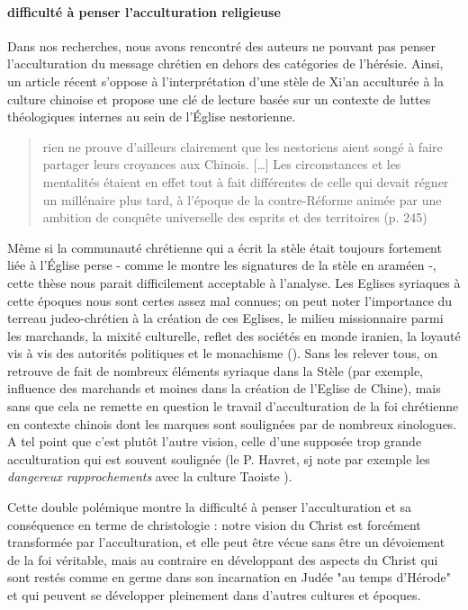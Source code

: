 \paragraph{difficulté à penser l'acculturation religieuse} Dans nos recherches, nous avons rencontré des auteurs ne pouvant pas penser l'acculturation du message chrétien en dehors des catégories de l'hérésie. Ainsi, un article récent \cite{Gernet:Stele} s'oppose à l'interprétation d'une stèle de Xi'an acculturée à la culture chinoise et propose une clé de lecture basée sur un contexte de luttes théologiques internes au sein de l'Église nestorienne.

\begin{quote}
    rien ne prouve d'ailleurs clairement que les nestoriens aient songé à faire partager leurs croyances aux Chinois. [\ldots] Les circonstances et les mentalités étaient en effet tout à fait différentes de celle qui devait régner un millénaire plus tard, à l'époque de la contre-Réforme animée par une ambition de conquête universelle des esprits et des territoires (p. 245)
\end{quote}
Même si la communauté chrétienne qui a écrit la stèle était toujours fortement liée à l'Église perse - comme le montre les signatures de la stèle en araméen -, cette thèse nous parait difficilement acceptable à l'analyse. Les Eglises syriaques à cette époques nous sont certes assez mal connues; on peut noter l'importance du terreau judeo-chrétien à la création de ces Eglises, le milieu missionnaire parmi les marchands, la mixité culturelle, reflet des sociétés en monde iranien, la loyauté vis à vis des autorités politiques et le monachisme (\cite{Amir:CoranHistoriens}). Sans les relever tous, on retrouve de fait de nombreux éléments syriaque dans la Stèle (par exemple, influence des marchands et moines dans la création de l'Eglise de Chine), mais sans que cela ne remette en question le travail d'acculturation de la foi chrétienne en contexte chinois dont les marques sont soulignées par de nombreux sinologues. A tel point que c'est plutôt l'autre vision, celle d'une supposée trop grande acculturation qui est souvent soulignée (le P. Havret, sj note par exemple les 
\textit{    dangereux rapprochements} avec la culture Taoiste \cite[p.21]{Havret:stelechretienne}).   


Cette double polémique montre la difficulté à penser l'acculturation et sa conséquence en terme de christologie : notre vision du Christ est forcément transformée par l'acculturation, et elle peut être vécue sans être un dévoiement de la foi véritable, mais au contraire en développant des aspects du Christ qui sont restés comme en germe dans son incarnation en Judée "au temps d'Hérode" et qui peuvent se développer pleinement dans d'autres cultures et époques. 
